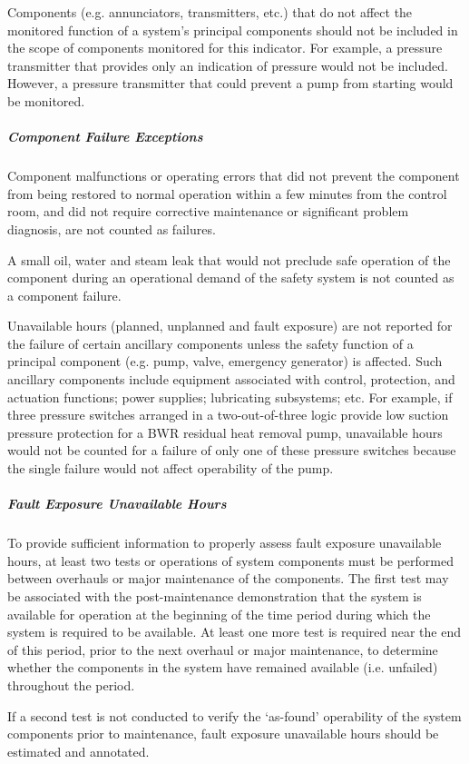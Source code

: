 Components (e.g. annunciators, transmitters, etc.) that do not affect
the monitored function of a system's principal components should not
be included in the scope of components monitored for this
indicator. For example, a pressure transmitter that provides only an
indication of pressure would not be included. However, a pressure
transmitter that could prevent a pump from starting would be
monitored.

\subparagraph{Component Failure Exceptions}

Component malfunctions or operating errors that did not prevent the
component from being restored to normal operation within a few minutes
from the control room, and did not require corrective maintenance or
significant problem diagnosis, are not counted as failures.

A small oil, water and steam leak that would not preclude safe
operation of the component during an operational demand of the safety
system is not counted as a component failure.

Unavailable hours (planned, unplanned and fault exposure) are not
reported for the failure of certain ancillary components unless the
safety function of a principal component (e.g. pump, valve, emergency
generator) is affected. Such ancillary components include equipment
associated with control, protection, and actuation functions; power
supplies; lubricating subsystems; etc. For example, if three pressure
switches arranged in a two-out-of-three logic provide low suction
pressure protection for a BWR residual heat removal pump, unavailable
hours would not be counted for a failure of only one of these pressure
switches because the single failure would not affect operability of
the pump.

\subparagraph{Fault Exposure Unavailable Hours}

To provide sufficient information to properly assess fault exposure
unavailable hours, at least two tests or operations of system
components must be performed between overhauls or major maintenance of
the components. The first test may be associated with the
post-maintenance demonstration that the system is available for
operation at the beginning of the time period during which the system
is required to be available. At least one more test is required near
the end of this period, prior to the next overhaul or major
maintenance, to determine whether the components in the system have
remained available (i.e. unfailed) throughout the period.

If a second test is not conducted to verify the ‘as-found’ operability
of the system components prior to maintenance, fault exposure
unavailable hours should be estimated and annotated.

